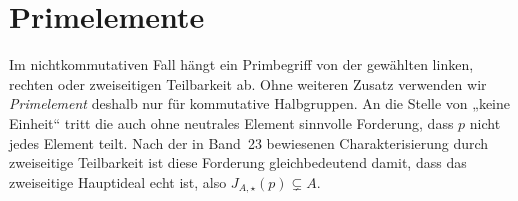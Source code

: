 \documentclass[main.tex]{subfiles}
\begin{document}
\begin{tabproof}
\end{tabproof}

\begin{tabproof}
\end{tabproof}

\section{Primelemente}

Im nichtkommutativen Fall hängt ein Primbegriff von der gewählten linken,
rechten oder zweiseitigen Teilbarkeit ab.  Ohne weiteren Zusatz verwenden
wir \emph{Primelement} deshalb nur für kommutative Halbgruppen.  An die Stelle
von „keine Einheit“ tritt die auch ohne neutrales Element sinnvolle
Forderung, dass \(p\) nicht jedes Element teilt. Nach der in Band~23
bewiesenen Charakterisierung durch zweiseitige Teilbarkeit ist diese
Forderung gleichbedeutend damit, dass das zweiseitige Hauptideal echt ist,
also \(J_{A,\star}(p)\subsetneq A\).
\end{document}
